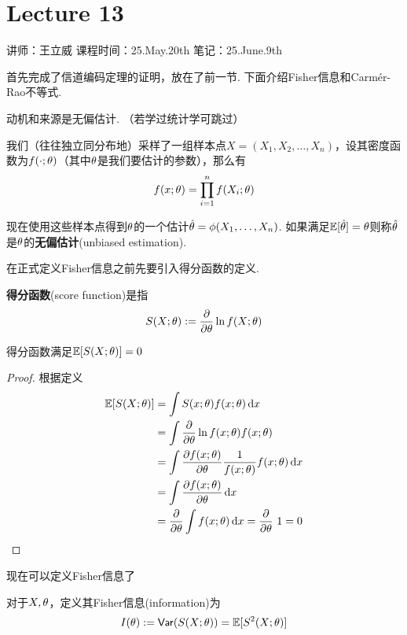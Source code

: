 \chapter{Lecture 13}

\begin{center}
    讲师：王立威 \qquad
    课程时间：25.May.20th \qquad 
    笔记：25.June.9th
\end{center}

\bigskip

首先完成了信道编码定理的证明，放在了前一节. 下面介绍Fisher信息和Carm​​ér-Rao不等式. 

动机和来源是无偏估计. （若学过统计学可跳过）
\begin{definition}[无偏估计]
    我们（往往独立同分布地）采样了一组样本点$X=(X_1,X_2,\dots, X_n)$，设其密度函数为$f(\cdot;\theta)$（其中$\theta$是我们要估计的参数），那么有 
    \[
    f(x;\theta) = \prod_{i=1}^n f(X_i; \theta)
    \]
    
    现在使用这些样本点得到$\theta$的一个估计$\hat{\theta} = \phi(X_1,\dots, X_n)$. 如果满足$\mathbb{E}[\hat{\theta}] = \theta$则称$\hat{\theta}$是$\theta$的\textbf{无偏估计}(unbiased estimation).
\end{definition} 

在正式定义Fisher信息之前先要引入得分函数的定义. 
\begin{definition}[得分函数]
    \textbf{得分函数}(score function)是指 
    \[
    S(X;\theta) := \dfrac{\partial}{\partial\theta} \ln f(X;\theta)
    \]
\end{definition}

\begin{proposition}
    得分函数满足$\mathbb{E}[S(X;\theta)] = 0$
\end{proposition}
\begin{proof}
    根据定义 
    \begin{align*}
        \mathbb{E}[S(X;\theta)] & = \int S(x;\theta) f(x;\theta) \mathop{}\!\mathrm{d}x \\
        & = \int \dfrac{\partial}{\partial\theta} \ln f(x;\theta) f(x;\theta) \\
        & = \int \dfrac{\partial f(x;\theta)}{\partial\theta} \dfrac{1}{f(x;\theta)} f(x;\theta) \mathop{}\!\mathrm{d}x \\ 
        & = \int \dfrac{\partial f(x;\theta)}{\partial\theta} \mathop{}\!\mathrm{d}x \\
        & = \dfrac{\partial}{\partial\theta}\int f(x;\theta) \mathop{}\!\mathrm{d}x = \dfrac{\partial}{\partial\theta} \ 1 = 0
    \end{align*}
\end{proof} 

现在可以定义Fisher信息了
\begin{definition}[Fisher信息]
    对于$X,\theta$，定义其Fisher信息(information)为 
    \[
    I(\theta) := \mathsf{Var}(S(X;\theta)) = \mathbb{E}[S^2(X;\theta)]
    \]
\end{definition}

